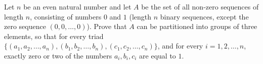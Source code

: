 Let $n$ be an even natural number and let $A$ be the set of all non-zero sequences of length $n$, consisting of numbers $0$ and $1$ (length $n$ binary sequences, except the zero sequence $(0,0,\ldots,0)$). Prove that $A$ can be partitioned into groups of three elements, so that for every triad $\{(a_1,a_2,\ldots,a_n), (b_1,b_2,\ldots,b_n), (c_1,c_2,\ldots,c_n)\}$, and for every $i = 1, 2,\ldots,n$, exactly zero or two of the numbers $a_i, b_i, c_i$ are equal to $1$.